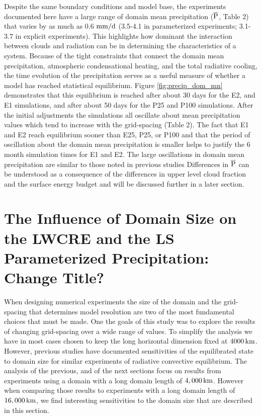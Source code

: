 \documentclass[draft]{agujournal2019}
\begin{document}
Despite the same boundary conditions and model base, the experiments documented here have a
large range of domain mean precipitation ($\rm{\overline{P}}$, Table 2) that varies by as much as 
0.6 $\rm{mm/d}$ (3.5-4.1 in parameterized experiments; 3.1-3.7 in explicit experiments).
This highlights how dominant the interaction between clouds and radiation can be in determining the 
characteristics of a system.
Because of the tight constraints that connect the domain mean precipitation, atmospheric condensational heating, and 
the total radiative cooling, the time evolution of the precipitation serves as a useful measure of whether a model has 
reached statistical equilibrium.  Figure \ref{fig:precip_dom_mn} demonstrates that this equilibrium is reached after about 30 
days for the E2, and E1 simulations, and after about 50 days for the P25 and P100 simulations.   After the initial adjustments
the simulations all oscillate about mean precipitation values which tend to increase with the grid-spacing 
(Table 2).   The fact that E1 and E2 reach equilibrium sooner than E25, P25, or P100 and that the period of oscillation 
about the domain mean precipitation is smaller helps to justify the 6 month simulation times for E1 and E2.  
The large oscillations in domain mean precipitation are similar to those noted in previous studies 
\cite{Silvers2016, Patrizio2019}
Differences in $\rm{\overline{P}}$ can be understood as a consequence of the differences in upper level cloud fraction 
and the surface energy budget and will be discussed further in a later section.   



\section{The Influence of Domain Size on the LWCRE and the LS Parameterized Precipitation: Change Title?}

When designing numerical experiments the size of the domain and the grid-spacing that determines model resolution are 
two of the most fundamental choices that must be made.   One the goals of this study was to explore the results of 
changing grid-spacing over a wide range of values.  To simplify the analysis we have in most cases chosen to keep the 
long horizontal dimension fixed at $4000\, \rm{km}$.  However, previous studies 
\cite{Bretherton2005, Bretherton2006, Muller2012, Jeevanjee2013, Silvers2016, Patrizio2019}
have documented sensitivities of the equilibrated state to domain size for similar experiments
of radiative convective equilibrium.   
The analysis of the previous, and of the next sections focus on results from 
experiments using a domain with a long domain length of $4,000 \, \rm{km}$.  However when comparing those results
to experiments with a long domain length of $16,000 \, \rm{km}$, we find interesting 
sensitivities to the domain size that are described in this section. 
\end{document}
